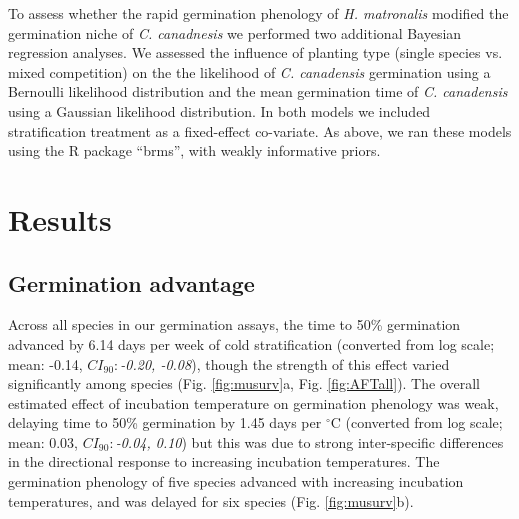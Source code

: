 \documentclass{article}[11pt]
\begin{document}
To assess whether the rapid germination phenology of \textit{H. matronalis} modified the germination niche of \textit{C. canadnesis} we performed two additional Bayesian regression analyses. We assessed the influence of planting type (single species vs. mixed competition) on the the likelihood of \textit{C. canadensis} germination using a Bernoulli likelihood distribution and the mean germination time of \textit{C. canadensis} using a Gaussian likelihood distribution. In both models we included stratification treatment as a fixed-effect co-variate. As above, we ran these models using the R package ``brms''\citep{Burkner2018}, with weakly informative priors.

\section*{Results}
\subsection*{Germination advantage}
Across all species in our germination assays, the time to 50\% germination advanced by 6.14 days per week of cold stratification (converted from log scale; mean: -0.14, $CI_{90}:$\textit{-0.20, -0.08}), though the strength of this effect varied significantly among species  (Fig. \ref{fig:musurv}a, Fig. \ref{fig:AFTall}). The overall estimated effect of incubation temperature on germination phenology was weak, delaying time to 50\% germination by 1.45 days per $^{\circ}$C (converted from log scale; mean: 0.03, $CI_{90}:$\textit{-0.04, 0.10}) but this was due to strong inter-specific differences in the directional response to increasing incubation temperatures. The germination phenology of five species advanced with increasing incubation temperatures, and was delayed for six species (Fig. \ref{fig:musurv}b).%
\end{document}
